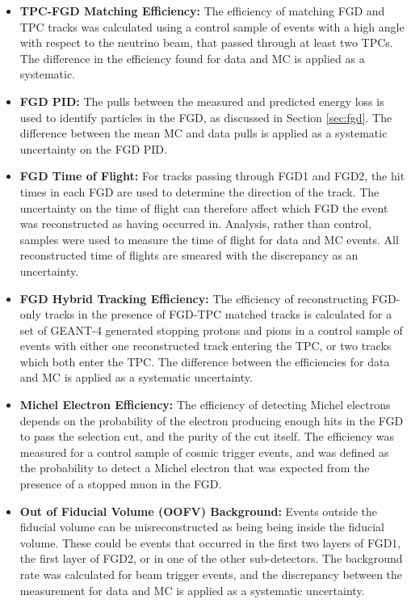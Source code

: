 \begin{itemize}
\item \textbf{TPC-FGD Matching Efficiency:} The efficiency of matching FGD and TPC tracks was calculated using a control sample of events with a high angle with respect to the neutrino beam, that passed through at least two TPCs. The difference in the efficiency found for data and MC is applied as a systematic.

\item \textbf{FGD PID:} The pulls between the measured and predicted energy loss is used to identify particles in the FGD, as discussed in Section \ref{sec:fgd}. The difference between the mean MC and data pulls is applied as a systematic uncertainty on the FGD PID.

\item \textbf{FGD Time of Flight:} For tracks passing through FGD1 and FGD2, the hit times in each FGD are used to determine the direction of the track. The uncertainty on the time of flight can therefore affect which FGD the event was reconstructed as having occurred in. Analysis, rather than control, samples were used to measure the time of flight for data and MC events. All reconstructed time of flights are smeared with the discrepancy as an uncertainty.

\item \textbf{FGD Hybrid Tracking Efficiency:} The efficiency of reconstructing FGD-only tracks in the presence of FGD-TPC matched tracks is calculated for a set of GEANT-4 generated stopping protons and pions in a control sample of events with either one reconstructed track entering the TPC, or two tracks which both enter the TPC. The difference between the efficiencies for data and MC is applied as a systematic uncertainty.

\item \textbf{Michel Electron Efficiency:} The efficiency of detecting Michel electrons depends on the probability of the electron producing enough hits in the FGD to pass the selection cut, and the purity of the cut itself. The efficiency was measured for a control sample of cosmic trigger events, and was defined as the probability to detect a Michel electron that was expected from the presence of a stopped muon in the FGD.

\item \textbf{Out of Fiducial Volume (OOFV) Background:} Events outside the fiducial volume can be misreconstructed as being being inside the fiducial volume. These could be events that occurred in the first two layers of FGD1, the first layer of FGD2, or in one of the other sub-detectors. The background rate was calculated for beam trigger events, and the discrepancy between the measurement for data and MC is applied as a systematic uncertainty.


\end{itemize}

